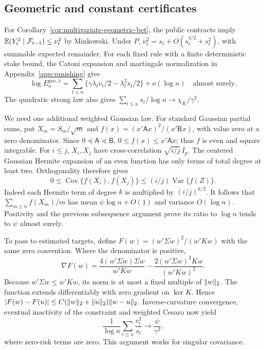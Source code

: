 \subsection{Geometric and constant certificates}
For Corollary~\ref{cor:multivariate-geometric-bet}, the public contracts imply
$\mathbb E(Y_t^2\mid\mathcal F_{t-1})\le\nu_t^2$ by Minkowski. Under $P$,
$\nu_t^2=s_t+O(s_t^{3/2}+s_t^2)$, with summable expected remainder.
For each fixed rule with a finite deterministic stake bound, the Catoni
expansion and martingale normalization in Appendix~\ref{app:vanishing} give
\[
 \log E_n^{\mathrm{geo},\lambda}
 =\sum_{t\le n}\{\gamma\lambda_tv_t/2-\lambda_t^2s_t/2\}
                       +o(\log n)\quad\text{almost surely}.
\]
The quadratic strong law also gives
$\sum_{t\le n}s_t/\log n\to\chi_K/\gamma^2$.

We need one additional weighted Gaussian law. For standard Gaussian partial
sums, put $X_m=S_m/\sqrt m$ and
$f(x)=(x'\mathsf A x)^2/(x'\mathsf B x)$, with value zero at a zero
denominator. Since $0\preceq\mathsf A\preceq\mathsf B$,
$0\le f(x)\le x'\mathsf A x$; thus $f$ is even and square integrable.
For $i\le j$, $X_i,X_j$ have cross-correlation $\sqrt{i/j}\,I_p$.
The centered Gaussian Hermite expansion of an even function has only terms
of total degree at least two. Orthogonality therefore gives
\[
 0\le\operatorname{Cov}\{f(X_i),f(X_j)\}
            \le(i/j)\operatorname{Var}\{f(Z)\}.
\]
Indeed each Hermite term of degree $k$ is multiplied by $(i/j)^{k/2}$.
It follows that $\sum_{m\le n}f(X_m)/m$ has mean
$\psi\log n+O(1)$ and variance $O(\log n)$. Positivity and the previous
subsequence argument prove its ratio to $\log n$ tends to $\psi$ almost
surely.

To pass to estimated targets, define
$F(w)=(w'\Sigma w)^2/(w'Kw)$ with the same zero convention. Where the
denominator is positive,
\[
 \nabla F(w)=
 \frac{4(w'\Sigma w)\Sigma w}{w'Kw}
 -\frac{2(w'\Sigma w)^2Kw}{(w'Kw)^2}.
\]
Because $w'\Sigma w\le w'Kw$, its norm is at most a fixed multiple of
$\lVert w\rVert_2$. The function extends differentiably with zero gradient on
$\ker K$. Hence
$|F(w)-F(u)|\le C(\lVert w\rVert_2+\lVert u\rVert_2)\lVert w-u\rVert_2$.
Inverse-curvature convergence, eventual inactivity of the constraint and
weighted Cesaro now yield
\[
 \frac1{\log n}\sum_{t\le n}\frac{v_t^2}{s_t}
                 \longrightarrow\frac{\psi}{\gamma^2},
\]
where zero-risk terms are zero. This argument works for singular covariance.

